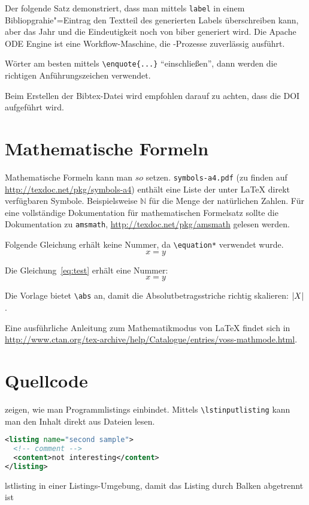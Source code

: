 Der folgende Satz demonstriert, dass man mittels \texttt{label} in einem Bibliopgrahie"=Eintrag den Textteil des generierten Labels überschreiben kann, aber das Jahr und die Eindeutigkeit noch von biber generiert wird.
Die Apache ODE Engine \cite{ApacheODE} ist eine Workflow-Maschine, die \BPEL-Prozesse zuverlässig ausführt.

Wörter am besten mittels \texttt{\textbackslash enquote\{...\}} \enquote{einschließen}, dann werden die richtigen Anführungszeichen verwendet.

Beim Erstellen der Bibtex-Datei wird empfohlen darauf zu achten, dass die DOI aufgeführt wird.

\section{Mathematische Formeln}
\label{sec:mf}
Mathematische Formeln kann man $so$ setzen. \texttt{symbols-a4.pdf} (zu finden auf \url{http://texdoc.net/pkg/symbols-a4}) enthält eine Liste der unter LaTeX direkt verfügbaren Symbole.
Beispielsweise $\mathbb{N}$ für die Menge der natürlichen Zahlen.
Für eine vollständige Dokumentation für mathematischen Formelsatz sollte die Dokumentation zu \texttt{amsmath}, \url{http://texdoc.net/pkg/amsmath} gelesen werden.

Folgende Gleichung erhält keine Nummer, da \texttt{\textbackslash equation*} verwendet wurde.
\begin{equation*}
  x = y
\end{equation*}

Die Gleichung~\ref{eq:test} erhält eine Nummer:
\begin{equation}
  \label{eq:test}
  x = y
\end{equation}

Die Vorlage bietet \verb+\abs+ an, damit die Absolutbetragsstriche richtig skalieren:
$\left\lvert X\right\rvert$.

Eine ausführliche Anleitung zum Mathematikmodus von LaTeX findet sich in \url{http://www.ctan.org/tex-archive/help/Catalogue/entries/voss-mathmode.html}.

\section{Quellcode}
 zeigen, wie man Programmlistings einbindet.
Mittels \texttt{\textbackslash lstinputlisting} kann man den Inhalt direkt aus Dateien lesen.

\begin{Listing}
  \begin{lstlisting}[language=XML]
<listing name="second sample">
  <!-- comment -->
  <content>not interesting</content>
</listing>
\end{lstlisting}
  \caption{lstlisting in einer Listings-Umgebung, damit das Listing durch Balken abgetrennt ist}
  \label{lst:ListingANDlstlisting}
\end{Listing}

